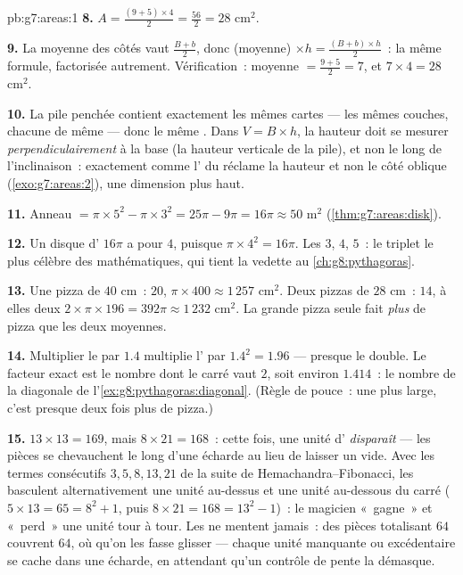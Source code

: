 \begin{solution}{pb:g7:areas:1}
\textbf{8.} $A = \frac{(9 + 5) \times 4}{2} = \frac{56}{2} =
28$ cm$^2$.

\textbf{9.} La moyenne des côtés  vaut $\frac{B + b}{2}$,
donc (moyenne) $\times h = \frac{(B+b) \times h}{2}$~: la même
formule, factorisée autrement. Vérification~: moyenne
$= \frac{9+5}{2} = 7$, et $7 \times 4 = 28$ cm$^2$.

\textbf{10.} La pile penchée contient exactement les mêmes cartes
--- les mêmes couches, chacune de même  --- donc le même .
Dans $V = B \times h$, la hauteur doit se mesurer
\emph{perpendiculairement} à la base (la hauteur verticale de la
pile), et non le long de l'inclinaison~: exactement comme l' du
 réclame la hauteur  et non le côté
oblique (\cref{exo:g7:areas:2}), une dimension plus haut.

\textbf{11.} Anneau $= \pi \times 5^2 - \pi \times 3^2 = 25\pi -
9\pi = 16\pi \approx 50$ m$^2$ (\cref{thm:g7:areas:disk}).

\textbf{12.} Un disque d' $16\pi$ a pour  $4$, puisque
$\pi \times 4^2 = 16\pi$. Les  $3$, $4$, $5$~: le triplet le
plus célèbre des mathématiques, qui tient la vedette au
\cref{ch:g8:pythagoras}.

\textbf{13.} Une pizza de $40$ cm~:  $20$, 
$\pi \times 400 \approx 1\,257$ cm$^2$. Deux pizzas de $28$ cm~:
 $14$, à elles deux
$2 \times \pi \times 196 = 392\pi \approx 1\,232$ cm$^2$. La grande
pizza seule fait \emph{plus} de pizza que les deux moyennes.

\textbf{14.} Multiplier le  par $1.4$ multiplie l' par
$1.4^2 = 1.96$ --- presque le double. Le facteur exact est le nombre
dont le carré vaut $2$, soit environ $1.414$~: le nombre de la
diagonale de l'\cref{ex:g8:pythagoras:diagonal}. (Règle de pouce~:
une  plus large, c'est presque deux fois plus de pizza.)

\textbf{15.} $13 \times 13 = 169$, mais $8 \times 21 = 168$~: cette
fois, une unité d' \emph{disparaît} --- les pièces se
chevauchent le long d'une écharde au lieu de laisser un vide. Avec
les termes consécutifs $3, 5, 8, 13, 21$ de la suite de
Hemachandra--Fibonacci, les  basculent alternativement une
unité au-dessus et une unité au-dessous du carré
($5 \times 13 = 65 = 8^2 + 1$, puis
$8 \times 21 = 168 = 13^2 - 1$)~: le magicien «~gagne~» et
«~perd~» une unité tour à tour. Les  ne mentent jamais~: des
pièces totalisant $64$ couvrent $64$, où qu'on les fasse glisser ---
chaque unité manquante ou excédentaire se cache dans une écharde, en
attendant qu'un contrôle de pente la démasque.
\end{solution}
